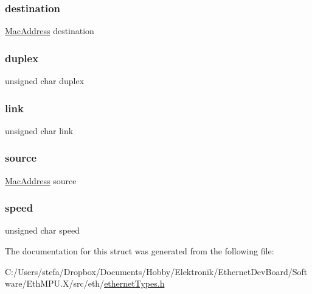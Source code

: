 \subsubsection{\texorpdfstring{destination}{destination}}
{\footnotesize\ttfamily \mbox{\hyperlink{ethernet_types_8h_a7fed77396097fa92ca5f4b185844244c}{Mac\+Address}} destination}

\mbox{\label{structethernet_connection___ab6f2a37edfa559162baa4fbfe00b12c1}} 
\subsubsection{\texorpdfstring{duplex}{duplex}}
{\footnotesize\ttfamily unsigned char duplex}

\mbox{\label{structethernet_connection___a1fe5419ef8790482bf98c1ab99a0352e}} 
\subsubsection{\texorpdfstring{link}{link}}
{\footnotesize\ttfamily unsigned char link}

\mbox{\label{structethernet_connection___ad921b9c440e49b18b551c1c6bda03dcc}} 
\subsubsection{\texorpdfstring{source}{source}}
{\footnotesize\ttfamily \mbox{\hyperlink{ethernet_types_8h_a7fed77396097fa92ca5f4b185844244c}{Mac\+Address}} source}

\mbox{\label{structethernet_connection___aa4eab0a1ec935e4bbdf16be9c7963f3c}} 
\subsubsection{\texorpdfstring{speed}{speed}}
{\footnotesize\ttfamily unsigned char speed}



The documentation for this struct was generated from the following file\+:\begin{DoxyCompactItemize}
\item 
C\+:/\+Users/stefa/\+Dropbox/\+Documents/\+Hobby/\+Elektronik/\+Ethernet\+Dev\+Board/\+Software/\+Eth\+M\+P\+U.\+X/src/eth/\mbox{\hyperlink{ethernet_types_8h}{ethernet\+Types.\+h}}\end{DoxyCompactItemize}
